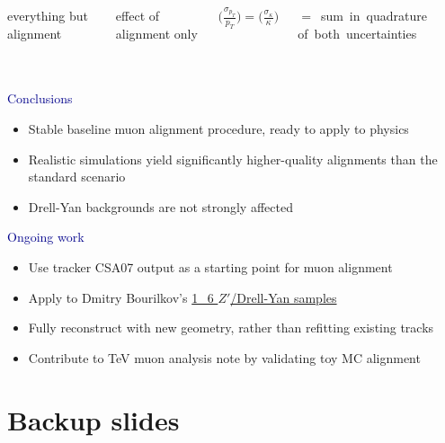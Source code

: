 \documentclass[compress]{beamer}
\begin{document}
\begin{frame}
\begin{columns}
everything but alignment

\vspace{1.5 cm}
effect of alignment only

\vspace{1.5 cm}
$\displaystyle \bigg(\frac{\sigma_{p_T}}{p_T}\bigg) = \bigg(\frac{\sigma_\kappa}{\kappa}\bigg)$

\vspace{0.1 cm}
\mbox{$=$ sum in quadrature} \mbox{of both uncertainties}
\end{columns}
\end{frame}

\section*{}

\begin{frame}
\hspace{-0.83 cm} \textcolor{darkblue}{\Large Conclusions}
\begin{itemize}
\item Stable baseline muon alignment procedure, ready to apply to physics
\item Realistic simulations yield significantly higher-quality alignments than the standard scenario
\item Drell-Yan backgrounds are not strongly affected
\end{itemize}

\vfill
\hspace{-0.83 cm} \textcolor{darkblue}{\Large Ongoing work}
\begin{itemize}
\item Use tracker CSA07 output as a starting point for muon alignment
\item Apply to Dmitry Bourilkov's \textcolor{blue}{\href{https://hypernews.cern.ch/HyperNews/CMS/get/susybsm-hepairs/53.html}{1\_6 $Z'$/Drell-Yan samples}}
\item Fully reconstruct with new geometry, rather than refitting existing tracks
\item Contribute to TeV muon analysis note by validating toy MC alignment
\end{itemize}

\label{numpages}
\end{frame}

\section*{Backup slides}
\end{document}

